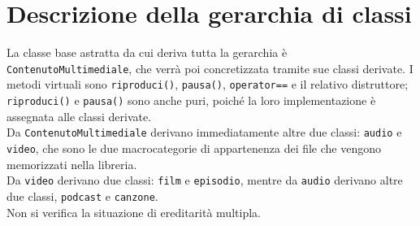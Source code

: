\documentclass[a4paper,10pt]{article}
\begin{document}
\section{Descrizione della gerarchia di classi}
La classe base astratta da cui deriva tutta la gerarchia è \texttt{ContenutoMultimediale}, che verrà poi concretizzata tramite sue classi derivate. I metodi virtuali sono \texttt{riproduci()}, \texttt{pausa()}, \texttt{operator==} e il relativo distruttore; \texttt{riproduci()} e \texttt{pausa()} sono anche puri, poiché la loro implementazione è assegnata alle classi derivate. \\
Da \texttt{ContenutoMultimediale} derivano immediatamente altre due classi: \texttt{audio} e \texttt{video}, che sono le due macrocategorie di appartenenza dei file che vengono memorizzati nella libreria. \\
Da \texttt{video} derivano due classi: \texttt{film} e \texttt{episodio}, mentre da \texttt{audio} derivano altre due classi, \texttt{podcast} e \texttt{canzone}. \\
Non si verifica la situazione di ereditarità multipla. \\
\end{document}
